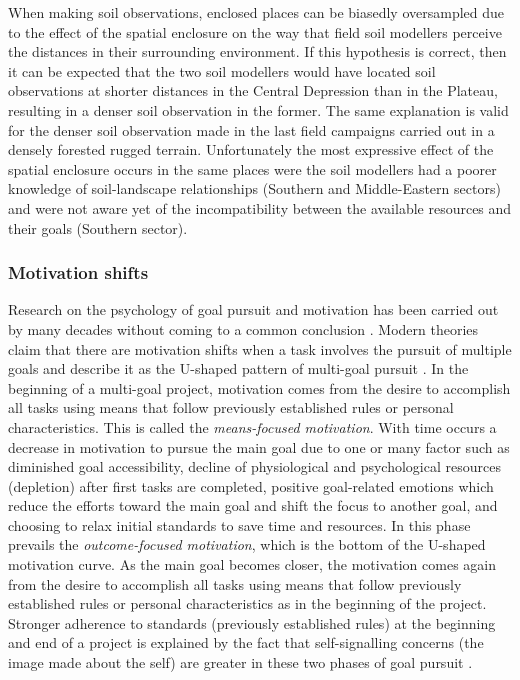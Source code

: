 When making soil observations, enclosed places can be biasedly oversampled due to the effect of the spatial 
enclosure on the way that field soil modellers perceive the distances in their surrounding environment. If 
this hypothesis is correct, then it can be expected that the two soil modellers would have located soil 
observations at shorter distances in the Central Depression than in the Plateau, resulting in a denser soil 
observation in the former. The same explanation is valid for the denser soil observation made in the last field
campaigns carried out in a densely forested rugged terrain. Unfortunately the most expressive effect of the 
spatial enclosure occurs in the same places were the soil modellers had a poorer knowledge of soil-landscape 
relationships (Southern and Middle-Eastern sectors) and were not aware yet of the incompatibility between the 
available resources and their goals (Southern sector).

\subsubsection{Motivation shifts}

Research on the psychology of goal pursuit and motivation has been carried out by many decades without coming 
to a common conclusion \cite{Toure-TilleryEtAl2011a, Hull1932}. Modern theories claim that there are motivation
shifts when a task involves the pursuit of multiple goals and describe it as the U-shaped pattern of multi-goal
pursuit \cite{BonezziEtAl2011, Toure-TilleryEtAl2011a}. In the beginning of a multi-goal project, motivation 
comes from the desire to accomplish all tasks using means that follow previously established rules or personal 
characteristics. This is called the \textit{means-focused motivation}. With time occurs a decrease in 
motivation to pursue the main goal due to one or many factor such as diminished goal accessibility, decline of 
physiological and psychological resources (depletion) after first tasks are completed, positive goal-related 
emotions which reduce the efforts toward the main goal and shift the focus to another goal, and choosing to 
relax initial standards to save time and resources. In this phase prevails the \textit{outcome-focused 
motivation}, which is the bottom of the U-shaped motivation curve. As the main goal becomes closer, the 
motivation comes again from the desire to accomplish all tasks using means that follow previously established 
rules or personal characteristics as in the beginning of the project. Stronger adherence to standards 
(previously established rules) at the beginning and end of a project is explained by the fact that 
self-signalling concerns (the image made about the self) are greater in these two phases of goal pursuit 
\cite{Toure-TilleryEtAl2011}.


